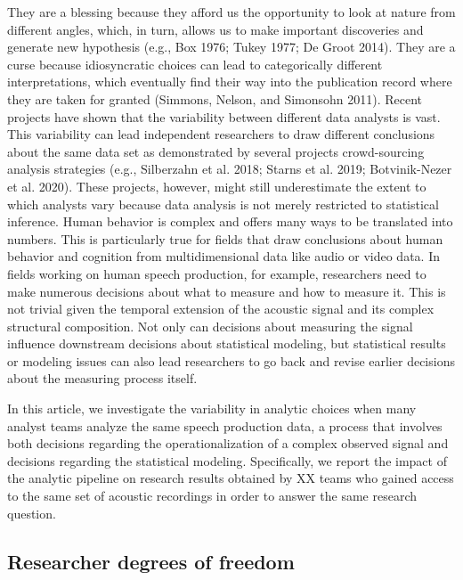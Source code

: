 \documentclass[
  12pt,
]{article}
\begin{document}
They are a blessing because they afford us the opportunity to look at nature from different angles, which, in turn, allows us to make important discoveries and generate new hypothesis (e.g., Box 1976; Tukey 1977; De Groot 2014).
They are a curse because idiosyncratic choices can lead to categorically different interpretations, which eventually find their way into the publication record where they are taken for granted (Simmons, Nelson, and Simonsohn 2011).
Recent projects have shown that the variability between different data analysts is vast.
This variability can lead independent researchers to draw different conclusions about the same data set as demonstrated by several projects crowd-sourcing analysis strategies (e.g., Silberzahn et al. 2018; Starns et al. 2019; Botvinik-Nezer et al. 2020).
These projects, however, might still underestimate the extent to which analysts vary because data analysis is not merely restricted to statistical inference.
Human behavior is complex and offers many ways to be translated into numbers.
This is particularly true for fields that draw conclusions about human behavior and cognition from multidimensional data like audio or video data.
In fields working on human speech production, for example, researchers need to make numerous decisions about what to measure and how to measure it.
This is not trivial given the temporal extension of the acoustic signal and its complex structural composition.
Not only can decisions about measuring the signal influence downstream decisions about statistical modeling, but statistical results or modeling issues can also lead researchers to go back and revise earlier decisions about the measuring process itself.

In this article, we investigate the variability in analytic choices when many analyst teams analyze the same speech production data, a process that involves both decisions regarding the operationalization of a complex observed signal and decisions regarding the statistical modeling.
Specifically, we report the impact of the analytic pipeline on research results obtained by XX teams who gained access to the same set of acoustic recordings in order to answer the same research question.

\hypertarget{researcher-degrees-of-freedom}{%
\subsection{Researcher degrees of freedom}\label{researcher-degrees-of-freedom}}
\end{document}
